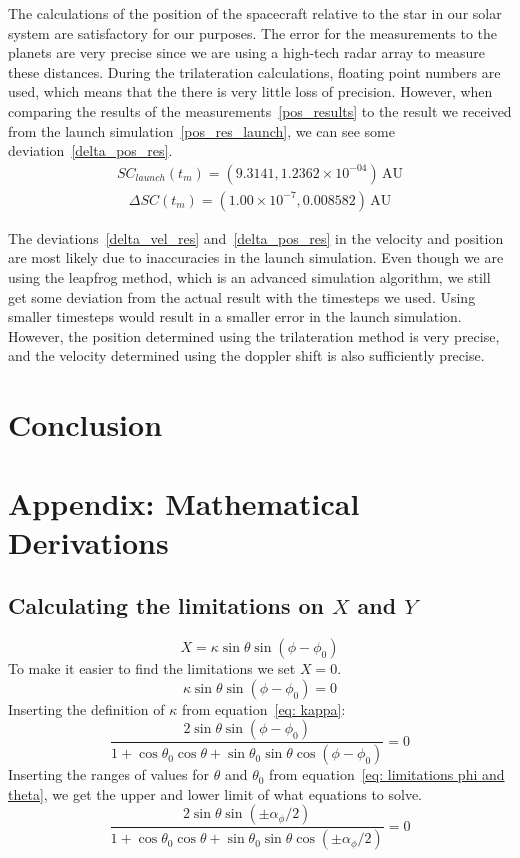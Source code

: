 \documentclass[reprint,english,notitlepage]{revtex4-2}
\begin{document}
The calculations of the position of the spacecraft relative to the star in our solar system are satisfactory for our purposes.
The error for the measurements to the planets are very precise since we are using a high-tech radar array to measure these distances.
During the trilateration calculations, floating point numbers are used, which means that the there is very little loss of precision.
However, when comparing the results of the measurements~\eqref{pos_results} to the result we received from the launch simulation~\eqref{pos_res_launch}, we can see some deviation~\eqref{delta_pos_res}.
\begin{align}
SC_{launch}(t_m) = (9.3141, 1.2362 \times 10^{-04}) \,\text{AU} \label{pos_res_launch}
\end{align}
\begin{align}
\Delta SC(t_m) = (1.00 \times 10^{-7}, 0.008582) \,\text{AU} \label{delta_pos_res}
\end{align}

The deviations~\eqref{delta_vel_res} and~\eqref{delta_pos_res} in the velocity and position are most likely due to inaccuracies in the launch simulation.
Even though we are using the leapfrog method, which is an advanced simulation algorithm, we still get some deviation from the actual result with the timesteps we used.
Using smaller timesteps would result in a smaller error in the launch simulation.
However, the position determined using the trilateration method is very precise, and the velocity determined using the doppler shift is also sufficiently precise.


\section{Conclusion} \label{sec:conclusion}



\section{Appendix: Mathematical Derivations}
\subsection{Calculating the limitations on $ X $ and $ Y $} \label{ssec: lim x,y}

\[
	X = \kappa  \sin \theta \sin (ϕ - ϕ _0)
\]
To make it easier to find the limitations we set $ X = 0 $. 
\[
\kappa \sin \theta \sin (ϕ - ϕ _0) = 0
\]
Inserting the definition of $ \kappa $ from equation~\ref{eq: kappa}:
\[
	\frac{2 \sin θ \sin (ϕ - ϕ _0)}{1 + \cos \theta _{0}\cos \theta + \sin \theta _{0} \sin \theta \cos (\phi - \phi _{0})} = 0
\]
Inserting the ranges of values for $ \theta $ and $ \theta_0 $ from equation~\ref{eq: limitations phi and theta}, we get the upper and lower limit of what equations to solve.
\[
\frac{2 \sin  θ \sin (\pm α_ϕ / 2)}{1 + \cos θ_0 \cos θ + \sin θ_0 \sin  θ \cos (\pm α_ϕ / 2)} = 0
\]


\newpage
\end{document}
